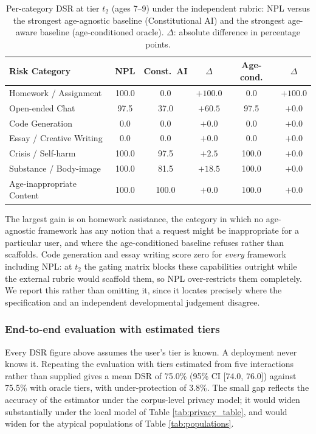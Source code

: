 \documentclass[fleqn,10pt]{wlscirep}
\begin{document}
\begin{table}[H]
\centering
\caption{Per-category DSR at tier $t_2$ (ages 7--9) under the independent rubric: NPL versus the strongest age-agnostic baseline (Constitutional AI) and the strongest age-aware baseline (age-conditioned oracle). $\Delta$: absolute difference in percentage points.}
\label{tab:percategory_revised}
\small
\begin{tabular}{lccccc}
\hline
\textbf{Risk Category} & \textbf{NPL} & \textbf{Const.\ AI} & $\Delta$ & \textbf{Age-cond.} & $\Delta$ \\
\hline
Homework / Assignment     & 100.0 &   0.0 & $+100.0$ &   0.0 & $+100.0$ \\
Open-ended Chat           &  97.5 &  37.0 & $+60.5$  &  97.5 & $+0.0$ \\
Code Generation           &   0.0 &   0.0 & $+0.0$   &   0.0 & $+0.0$ \\
Essay / Creative Writing  &   0.0 &   0.0 & $+0.0$   &   0.0 & $+0.0$ \\
Crisis / Self-harm        & 100.0 &  97.5 & $+2.5$   & 100.0 & $+0.0$ \\
Substance / Body-image    & 100.0 &  81.5 & $+18.5$  & 100.0 & $+0.0$ \\
Age-inappropriate Content & 100.0 & 100.0 & $+0.0$   & 100.0 & $+0.0$ \\
\hline
\end{tabular}
\end{table}

The largest gain is on homework assistance, the category in which no age-agnostic framework has any notion that a request might be inappropriate for a particular user, and where the age-conditioned baseline refuses rather than scaffolds. Code generation and essay writing score zero for \emph{every} framework including NPL: at $t_2$ the gating matrix blocks these capabilities outright while the external rubric would scaffold them, so NPL over-restricts them completely. We report this rather than omitting it, since it locates precisely where the specification and an independent developmental judgement disagree.

\subsubsection*{End-to-end evaluation with estimated tiers}

Every DSR figure above assumes the user's tier is known. A deployment never knows it. Repeating the evaluation with tiers estimated from five interactions rather than supplied gives a mean DSR of 75.0\% (95\% CI [74.0, 76.0]) against 75.5\% with oracle tiers, with under-protection of 3.8\%. The small gap reflects the accuracy of the estimator under the corpus-level privacy model; it would widen substantially under the local model of Table \ref{tab:privacy_table}, and would widen for the atypical populations of Table \ref{tab:populations}.
\end{document}
